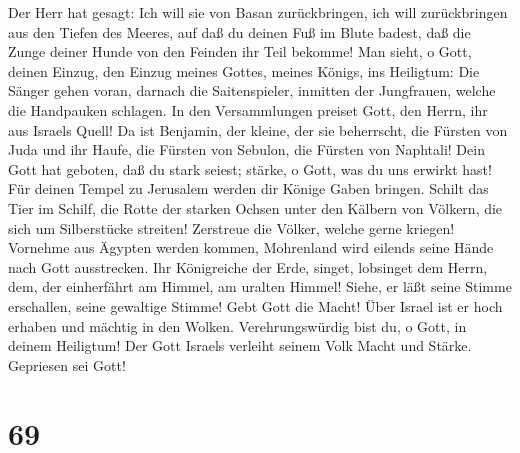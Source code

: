  Der Herr hat gesagt: Ich will sie von Basan
zurückbringen, ich will zurückbringen aus den Tiefen des Meeres,
 auf daß du deinen Fuß im Blute badest, daß die Zunge
deiner Hunde von den Feinden ihr Teil bekomme!  Man
sieht, o Gott, deinen Einzug, den Einzug meines Gottes, meines Königs,
ins Heiligtum:  Die Sänger gehen voran, darnach die
Saitenspieler, inmitten der Jungfrauen, welche die Handpauken schlagen.
 In den Versammlungen preiset Gott, den Herrn, ihr aus
Israels Quell!  Da ist Benjamin, der kleine, der sie
beherrscht, die Fürsten von Juda und ihr Haufe, die Fürsten von Sebulon,
die Fürsten von Naphtali!  Dein Gott hat geboten, daß du
stark seiest; stärke, o Gott, was du uns erwirkt hast! 
Für deinen Tempel zu Jerusalem werden dir Könige Gaben bringen.
 Schilt das Tier im Schilf, die Rotte der starken Ochsen
unter den Kälbern von Völkern, die sich um Silberstücke streiten!
Zerstreue die Völker, welche gerne kriegen!  Vornehme aus
Ägypten werden kommen, Mohrenland wird eilends seine Hände nach Gott
ausstrecken.  Ihr Königreiche der Erde, singet, lobsinget
dem Herrn,  dem, der einherfährt am Himmel, am uralten
Himmel! Siehe, er läßt seine Stimme erschallen, seine gewaltige Stimme!
 Gebt Gott die Macht! Über Israel ist er hoch erhaben und
mächtig in den Wolken.  Verehrungswürdig bist du, o Gott,
in deinem Heiligtum! Der Gott Israels verleiht seinem Volk Macht und
Stärke. Gepriesen sei Gott!

\hypertarget{section-68}{%
\section{69}\label{section-68}}

